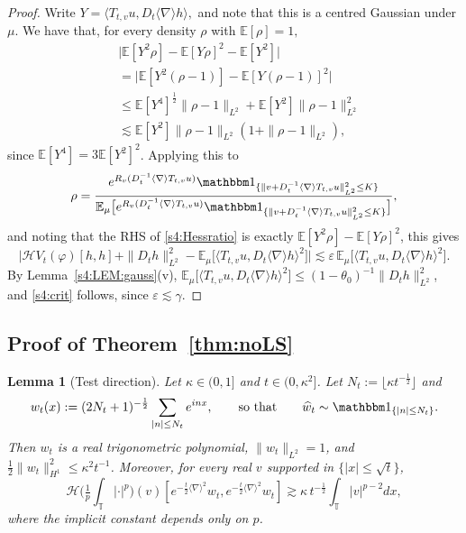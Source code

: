 \documentclass[letterpaper, 11pt,  reqno]{amsart}
\newtheorem{lemma}[theorem]{Lemma}
\theoremstyle{definition}
\newcommand{\1}{\mathbbm 1}
\newcommand{\T}{\mathbb{T}}
\renewcommand{\H}{\mathcal H}
\newcommand{\0}{\mathbf 0}
\newcommand{\E}{\mathbb{E}}
\newcommand{\nb}{\nabla}
\newcommand{\ep}{\varepsilon}
\newcommand{\ft}{\widehat}
\newcommand{\les}{\lesssim}
\newcommand{\ges}{\gtrsim}
\newcommand{\jb}[1]
{\langle #1 \rangle}
\newcommand{\ind}{\mathbbm 1}
\newcommand{\ph}{\varphi}
\renewcommand{\H}{\mathcal{H}}
\newcommand{\eps}{\ep}
\renewcommand{\ft}{\widehat}
\numberwithin{equation}{section}
\numberwithin{theorem}{section}
\newcommand{\HF}[2]{\mathcal H\big(\tfrac1p{\textstyle\int_\T}|\cdot|^p\big)(#1)[#2]}
\newcommand{\RT}{R_v(D_t^{-1}\jb\nb T_{t,v}u)}
\newcommand{\IT}{\ind_{\{\|v+D_t^{-1}\jb\nb T_{t,v}u\|_{L^2}^2\le K\}}}
\begin{document}
\begin{proof}
Write  $Y = \jb{T_{t,v}u,D_t\jb\nb h},$ and note that this is a centred Gaussian under $\mu$. We have that, for every density $\rho$ with $\E[\rho]=1,$
\begin{align*}
    &\big|\E[Y^2 \rho] - \E[Y\rho]^2 - \E[Y^2]\big| \\
    &= \big|\E[Y^2 (\rho-1)] - \E[Y(\rho-1)]^2\big| \\
    &\le \E[Y^4]^\frac12 \|\rho-1\|_{L^2} + \E[Y^2] \|\rho-1\|_{L^2}^2 \\
    &\les \E[Y^2]\|\rho-1\|_{L^2}(1 + \|\rho-1\|_{L^2}),
\end{align*}
since $\E[Y^4]=3\E[Y^2]^2$.
Applying this to
$$ \rho = \frac{e^{\RT}\IT}{\E_\mu\big[e^{\RT}\IT\big]},$$
and noting that the RHS of \eqref{s4:Hessratio} is exactly $\E[Y^2 \rho] - \E[Y\rho]^2$,
this gives
\[
\Big|\H V_t(\ph)[h,h]+\|D_th\|_{L^2}^2-\E_\mu\big[\jb{T_{t,v}u,D_t\jb\nb h}^2\big]\Big|
\les\eps\,\E_\mu\big[\jb{T_{t,v}u,D_t\jb\nb h}^2\big].
\]
By Lemma~\ref{s4:LEM:gauss}(v), $\E_\mu\big[\jb{T_{t,v}u,D_t\jb\nb h}^2\big]\le(1-\theta_0)^{-1}\|D_th\|_{L^2}^2$,
 and \eqref{s4:crit} follows, since $\eps\les\gamma$.
\end{proof}

\subsection{Proof of Theorem~\ref{thm:noLS}}
\label{s4:SUB:proof}

\begin{lemma}[Test direction]\label{s4:LEM:dir}
Let $\kappa\in(0,1]$ and $t\in(0,\kappa^2]$. Let $N_t:=\lfloor\kappa t^{-\frac12}\rfloor$ and
\[
w_t(x):=(2N_t+1)^{-\frac12}\sum_{|n|\le N_t}e^{inx},
\qquad\text{so that}\qquad
\ft w_t\sim\ind_{\{|n|\le N_t\}}.
\]
Then $w_t$ is a real trigonometric polynomial, $\|w_t\|_{L^2}=1$, and
$\frac12\|w_t\|_{H^1}^2\le\kappa^2t^{-1}$.
Moreover, for every real $v$ supported in $\{|x|\le\sqrt t\}$,
\begin{equation}\label{s4:gain}
\HF{v}{e^{-\frac t2\jb\nb^2}w_t,e^{-\frac t2\jb\nb^2}w_t}\ges\kappa\,t^{-\frac12}\int_\T|v|^{p-2}dx ,
\end{equation}
where the implicit constant depends only on $p$.
\end{lemma}
\end{document}
